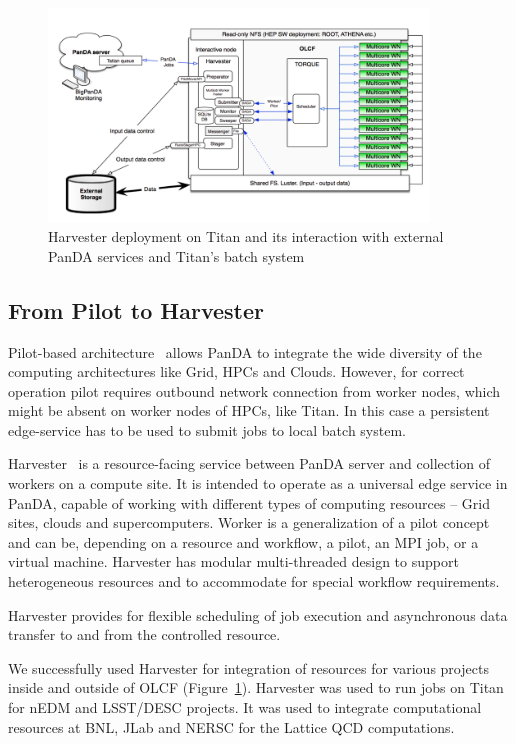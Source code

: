 \documentclass{webofc}
\begin{document}
\begin{figure}
  \centering
  \includegraphics[width=0.90\textwidth]{figures/Panda_at_OLCF.png}
  \caption{Harvester deployment on Titan and its interaction with external PanDA services and Titan's batch system}
  \label{fig:panda-OLCF}
\end{figure}

\subsection{From Pilot to Harvester} \label{section_harvester}

Pilot-based architecture~\cite{Nilsson_2008} allows PanDA to integrate the wide diversity of the computing architectures like Grid,  HPCs and Clouds. However, for correct operation pilot requires outbound network connection from worker nodes, which might be absent on worker nodes of HPCs, like Titan. In this case a persistent edge-service has to be used to submit jobs to local batch system.

Harvester~\cite{Megino_2017} is a resource-facing service between PanDA server and collection of workers on a compute site. It is intended to operate as a universal edge service in PanDA, capable of working with different types of computing resources -- Grid sites, clouds and supercomputers. Worker is a generalization of a pilot concept and can be, depending on a resource and workflow, a pilot, an MPI job, or a virtual machine. Harvester has modular multi-threaded design to support heterogeneous resources and to accommodate for special workflow requirements.

Harvester provides for flexible scheduling of job execution and asynchronous data transfer to and from the controlled resource.

We successfully used Harvester for integration of resources for various projects inside and outside of OLCF (Figure~\ref{fig:panda-OLCF}). Harvester was used to run jobs on Titan for nEDM and LSST/DESC projects. It was used to integrate computational resources at BNL, JLab and NERSC for the Lattice QCD computations.
\end{document}
